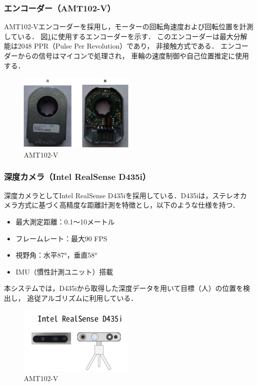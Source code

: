 \subsubsection{エンコーダー（AMT102-V）}
AMT102-Vエンコーダーを採用し，モーターの回転角速度および回転位置を計測している．
図\ref{fig:AMT102}に使用するエンコーダーを示す．
このエンコーダーは最大分解能は2048 PPR（Pulse Per Revolution）であり，
非接触方式である．
エンコーダーからの信号はマイコンで処理され，
車輪の速度制御や自己位置推定に使用する．

\begin{figure}[H]
    \centering
    \includegraphics[width=0.5\textwidth]{figure/AMT102.pdf}
    \caption{AMT102-V}
    \label{fig:AMT102}
\end{figure}

\subsubsection{深度カメラ（Intel RealSense D435i）}
深度カメラとしてIntel RealSense D435iを採用している．D435iは，ステレオカメラ方式に基づく高精度な距離計測を特徴とし，以下のような仕様を持つ．
\begin{itemize}
    \item 最大測定距離：0.1～10メートル
    \item フレームレート：最大90 FPS
    \item 視野角：水平87°，垂直58°
    \item IMU（慣性計測ユニット）搭載
\end{itemize}
本システムでは，D435iから取得した深度データを用いて目標（人）の位置を検出し，
追従アルゴリズムに利用している．

\begin{figure}[H]
    \centering
    \includegraphics[width=0.5\textwidth]{figure/RealSense.pdf}
    \caption{AMT102-V}
    \label{fig:RealSense}
\end{figure}



